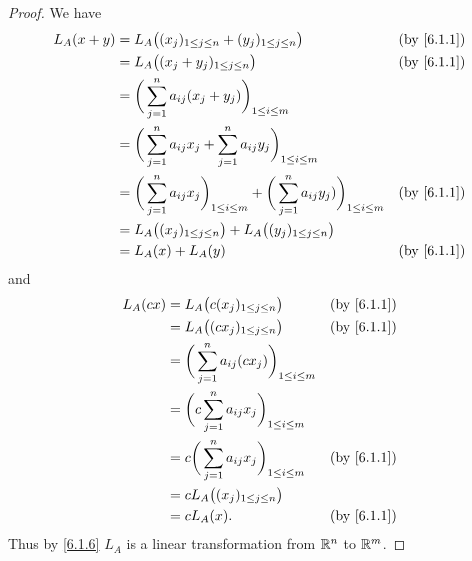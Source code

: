 \begin{proof}
  We have
  \begin{align*}
    L_A(x + y) & = L_A\big((x_j)_{1 \leq j \leq n} + (y_j)_{1 \leq j \leq n}\big)                                                     &  & \by{6.1.1} \\
               & = L_A\big((x_j + y_j)_{1 \leq j \leq n}\big)                                                                         &  & \by{6.1.1} \\
               & = \bigg(\sum_{j = 1}^n a_{ij} (x_j + y_j)\bigg)_{1 \leq i \leq m}                                                                    \\
               & = \bigg(\sum_{j = 1}^n a_{ij} x_j + \sum_{j = 1}^n a_{ij} y_j\bigg)_{1 \leq i \leq m}                                                \\
               & = \bigg(\sum_{j = 1}^n a_{ij} x_j\bigg)_{1 \leq i \leq m} + \bigg(\sum_{j = 1}^n a_{ij} y_j)\bigg)_{1 \leq i \leq m} &  & \by{6.1.1} \\
               & = L_A\big((x_j)_{1 \leq j \leq n}\big) + L_A\big((y_j)_{1 \leq j \leq n}\big)                                                        \\
               & = L_A(x) + L_A(y)                                                                                                    &  & \by{6.1.1}
  \end{align*}
  and
  \begin{align*}
    L_A(cx) & = L_A\big(c(x_j)_{1 \leq j \leq n}\big)                       &  & \by{6.1.1} \\
            & = L_A\big((cx_j)_{1 \leq j \leq n}\big)                       &  & \by{6.1.1} \\
            & = \bigg(\sum_{j = 1}^n a_{ij} (c x_j)\bigg)_{1 \leq i \leq m}                 \\
            & = \bigg(c \sum_{j = 1}^n a_{ij} x_j\bigg)_{1 \leq i \leq m}                   \\
            & = c \bigg(\sum_{j = 1}^n a_{ij} x_j\bigg)_{1 \leq i \leq m}   &  & \by{6.1.1} \\
            & = c L_A\big((x_j)_{1 \leq j \leq n}\big)                                      \\
            & = c L_A(x).                                                   &  & \by{6.1.1}
  \end{align*}
  Thus by \cref{6.1.6} \(L_A\) is a linear transformation from \(\mathbb{R}^n\) to \(\mathbb{R}^m\).
\end{proof}

